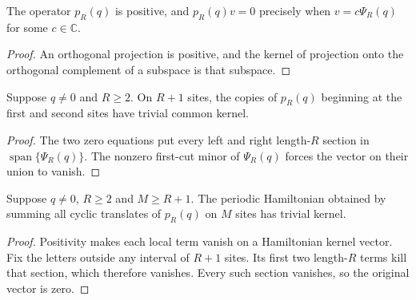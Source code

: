 \begin{lemma}
    \label{lem:pvbs_pure_window_kernel}
    \leanok
    The operator $p_R(q)$ is positive, and $p_R(q)v=0$ precisely when
    $v=c\Psi_R(q)$ for some $c\in\mathbb C$.
\end{lemma}
\begin{proof}
    \leanok
    An orthogonal projection is positive, and the kernel of projection
    onto the orthogonal complement of a subspace is that subspace.
\end{proof}

\begin{lemma}
    \label{lem:pvbs_pure_window_adjacent_kernel}
    \leanok
    Suppose $q\ne0$ and $R\ge2$. On $R+1$ sites, the copies of $p_R(q)$
    beginning at the first and second sites have trivial common kernel.
\end{lemma}
\begin{proof}
    \leanok
    The two zero equations put every left and right length-$R$ section
    in $\operatorname{span}\{\Psi_R(q)\}$. The nonzero first-cut minor of
    $\Psi_R(q)$ forces the vector on their union to vanish.
\end{proof}

\begin{lemma}
    \label{lem:pvbs_pure_window_large_kernel}
    \leanok
    Suppose $q\ne0$, $R\ge2$ and $M\ge R+1$. The periodic Hamiltonian
    obtained by summing all cyclic translates of $p_R(q)$ on $M$ sites
    has trivial kernel.
\end{lemma}
\begin{proof}
    \leanok
    Positivity makes each local term vanish on a Hamiltonian kernel
    vector. Fix the letters outside any interval of $R+1$ sites.
    Its first two length-$R$ terms kill that section, which therefore
    vanishes. Every such section vanishes, so the original vector is zero.
\end{proof}


